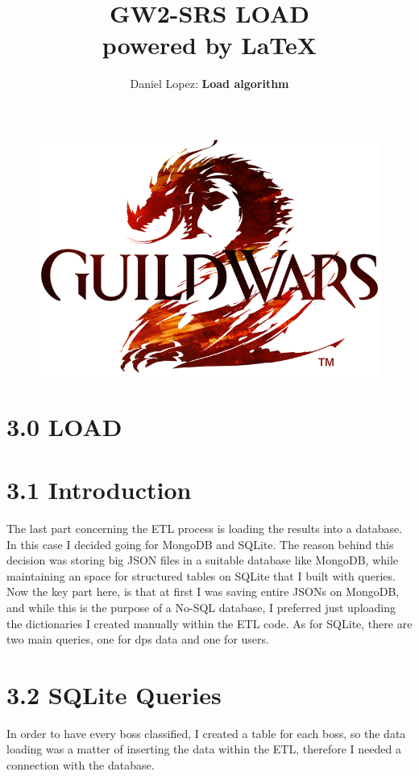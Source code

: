 \documentclass[12pt,a4paper]{article}
\title{%
    \vspace*{-5mm}\Huge GW2-SRS LOAD \\
    \vspace*{2mm}\Large powered by \LaTeX}
\author{\vspace*{-5mm}\large Daniel Lopez: \textbf{Load algorithm}}
\begin{document}
    \maketitle

    \begin{figure}[H]
        \centering
        \includegraphics[width=1 \textwidth]{Images/Nuevo_logo_GW2.png}
    \end{figure}

    \newpage

    \section*{3.0 LOAD}

    \section*{\large 3.1 Introduction}
    The last part concerning the ETL process is loading the results into a database. 
    In this case I decided going for MongoDB and SQLite.
    The reason behind this decision was storing big JSON files in a suitable database like MongoDB, while
    maintaining an space for structured tables on SQLite that I built with queries.\\

    Now the key part here, is that at first I was saving entire JSONs on MongoDB, and while this is the
    purpose of a No-SQL database, I preferred just uploading the dictionaries I created manually within the
    ETL code. As for SQLite, there are two main queries, one for dps data and one for users.

    \section*{\large 3.2 SQLite Queries}
    In order to have every boss classified, I created a table for each boss, so the data loading was a matter
    of inserting the data within the ETL, therefore I needed a connection with the database.\\
\end{document}
